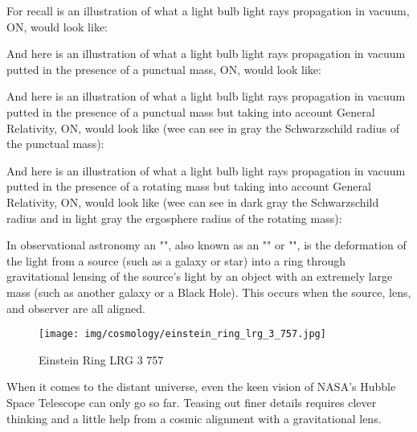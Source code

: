 	For recall is an illustration of what a light bulb light rays propagation in vacuum, ON, would look like:
	\begin{center}
	\centering
	\end{center}
	And here is an illustration of what a light bulb light rays propagation in vacuum putted in the presence of a punctual mass, ON, would look like:
	\begin{center}
	\centering
	\end{center}
	And here is an illustration of what a light bulb light rays propagation in vacuum putted in the presence of a punctual mass but taking into account General Relativity, ON, would look like (wee can see in gray the Schwarzschild radius of the punctual mass):
	\begin{center}
	\centering
	\end{center}
	And here is an illustration of what a light bulb light rays propagation in vacuum putted in the presence of a rotating mass but taking into account General Relativity, ON, would look like (wee can see in dark gray the Schwarzschild radius and in light gray the ergosphere radius of the rotating mass):
	\begin{center}
	\centering
	\end{center}
	
	In observational astronomy an "", also known as an "" or "", is the deformation of the light from a source (such as a galaxy or star) into a ring through gravitational lensing of the source's light by an object with an extremely large mass (such as another galaxy or a Black Hole). This occurs when the source, lens, and observer are all aligned.
	\begin{figure}[H]
		\centering
		\texttt{[image: img/cosmology/einstein\_ring\_lrg\_3\_757.jpg]}	
		\caption{Einstein Ring LRG 3 757}
	\end{figure}
	When it comes to the distant universe, even the keen vision of NASA's Hubble Space Telescope can only go so far. Teasing out finer details requires clever thinking and a little help from a cosmic alignment with a gravitational lens.

